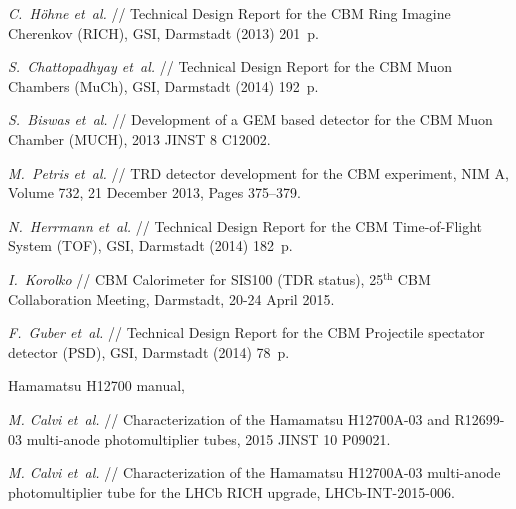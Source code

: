 \begin{thebibliography}{99}
\textit{C.~H\"{o}hne et~al.} //
Technical Design Report for the CBM Ring Imagine Cherenkov (RICH),
GSI, Darmstadt (2013) 201~p.

\textit{S.~Chattopadhyay et~al.} //
Technical Design Report for the CBM Muon Chambers (MuCh),
GSI, Darmstadt (2014) 192~p.

\textit{S.~Biswas et~al.} //
Development of a GEM based detector for the CBM Muon Chamber (MUCH),
2013 JINST 8 C12002.

\textit{M.~Petris et~al.} //
TRD detector development for the CBM experiment,
NIM A, Volume 732, 21 December 2013, Pages 375–379.

\textit{N.~Herrmann et~al.} //
Technical Design Report for the CBM Time-of-Flight System (TOF),
GSI, Darmstadt (2014) 182~p.

\textit{I.~Korolko} //
CBM Calorimeter for SIS100 (TDR status),
25$^\mathrm{th}$ CBM Collaboration Meeting, Darmstadt, 20-24 April 2015.\\

\textit{F.~Guber et~al.} //
Technical Design Report for the CBM Projectile spectator detector (PSD),
GSI, Darmstadt (2014) 78~p.


Hamamatsu H12700 manual,

\textit{M. Calvi et~al.} //
Characterization of the Hamamatsu H12700A-03 and R12699-03 multi-anode photomultiplier tubes,
2015 JINST 10 P09021.

\textit{M. Calvi et~al.} //
Characterization of the Hamamatsu H12700A-03 multi-anode photomultiplier tube for the LHCb RICH upgrade,
LHCb-INT-2015-006.




\end{thebibliography}
